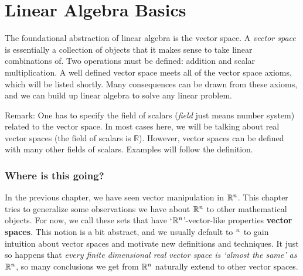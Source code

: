 \chapter{Linear Algebra Basics}

\setcounter{exercisecounter}{0}

\setcounter{thmcounter}{1}
    The foundational abstraction of linear algebra is the vector space. A \textit{vector space} is essentially a collection of objects that it
makes sense to take linear combinations of. Two operations must be defined: addition and scalar multiplication. A well defined
vector space meets all of the vector space axioms, which will be listed shortly. Many consequences can be drawn from these axioms,
and we can build up linear algebra to solve any linear problem.

Remark: One has to specify the field of scalars (\textit{field} just means number system) related to the vector space. In most cases
here, we will be talking about real vector spaces (the field of scalars is $\mathbb{R}$). However, vector spaces can be defined with
many other fields of scalars. Examples will follow the definition.
\subsection*{Where is this going?}
In the previous chapter, we have seen vector manipulation in $\mathbb{R}^n$. This chapter tries to generalize some observations we have about $\mathbb{R}^n$ to other mathematical objects.
For now, we call these sets that have `$\mathbb{R}^n$'-vector-like properties \textbf{vector spaces}. This notion is a bit abstract, and we usually default to $\real^n$
to gain intuition about vector spaces and motivate new definitions and techniques. It just so happens that \textit{every finite dimensional real vector space is `almost the same' as $\mathbb{R}^n$},
so many conclusions we get from $\mathbb{R}^n$ naturally extend to other vector spaces.

